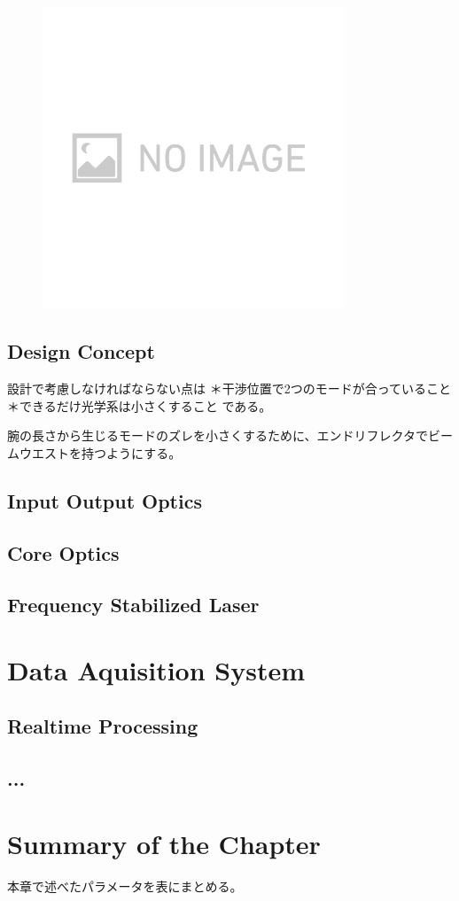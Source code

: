 \begin{figure}[h]
  \begin{center}   
    \includegraphics[width=9.0cm]{./img.png}
    \caption{}\label{img:img}
  \end{center}
\end{figure}


\subsection{Design Concept}
設計で考慮しなければならない点は
＊干渉位置で2つのモードが合っていること
＊できるだけ光学系は小さくすること
である。

腕の長さから生じるモードのズレを小さくするために、エンドリフレクタでビームウエストを持つようにする。

\subsection{Input Output Optics}

\subsection{Core Optics}

\subsection{Frequency Stabilized Laser}

\section{Data Aquisition System}
\subsection{Realtime Processing}
\subsection{...}



\section{Summary of the Chapter} %
本章で述べたパラメータを表にまとめる。

